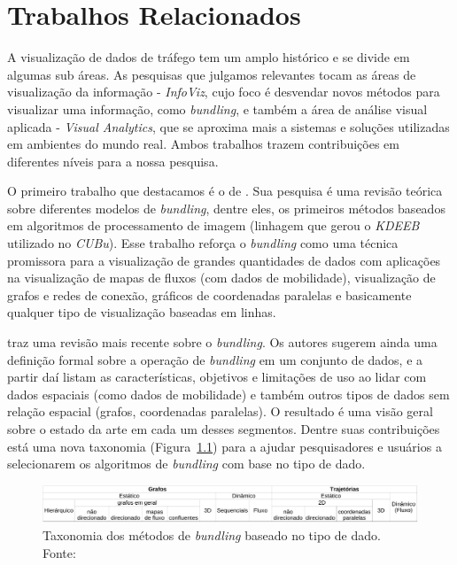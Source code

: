 \chapter{Trabalhos Relacionados}
\label{cap:trabalhos-relacionados}

  A visualização de dados de tráfego tem um amplo histórico e se divide em
algumas sub áreas. As pesquisas que julgamos relevantes tocam as áreas de
visualização da informação - \emph{InfoViz}, cujo foco é desvendar novos métodos
para visualizar uma informação, como \emph{bundling}, e também a área de análise
visual aplicada - \emph{Visual Analytics}, que se aproxima mais a sistemas e
soluções utilizadas em ambientes do mundo real. Ambos trabalhos trazem
contribuições em diferentes níveis para a nossa pesquisa.

O primeiro trabalho que destacamos é o de \citet{Zhou2013}.
Sua pesquisa é uma revisão teórica sobre diferentes modelos de \emph{bundling},
dentre eles, os primeiros métodos baseados em algoritmos de processamento de
imagem (linhagem que gerou o \emph{KDEEB} utilizado no \emph{CUBu}). Esse trabalho reforça o
\emph{bundling} como uma técnica promissora para a visualização de grandes
quantidades de dados com aplicações na visualização de mapas de fluxos (com
dados de mobilidade), visualização de grafos e redes de conexão, gráficos de
coordenadas paralelas e basicamente qualquer tipo de visualização baseadas em
linhas.

\citet{Lhuillier2017} traz uma revisão mais recente sobre
o \emph{bundling}. Os autores sugerem ainda uma definição formal sobre a operação de
\emph{bundling} em um conjunto de dados, e a partir daí listam as
características, objetivos e limitações de uso ao lidar com dados espaciais
(como dados de mobilidade) e também outros tipos de dados sem relação espacial
(grafos, coordenadas paralelas). O resultado é uma visão geral sobre o estado da
arte em cada um desses segmentos. Dentre suas contribuições está uma nova
taxonomia (Figura~\ref{table:bundling-methods}) para a ajudar pesquisadores e
usuários a selecionarem os algoritmos de \emph{bundling} com base no tipo de
dado. 

 \begin{figure}[!htb]
  \centering
  \includegraphics[width=\textwidth]{../figuras/estado-da-arte.pdf}
  \caption[Taxonomia dos métodos de \emph{bundling} baseado no tipo de dado]{Taxonomia dos métodos de \emph{bundling} baseado no tipo de dado. Fonte: \citet{Lhuillier2017}}
   \label{table:bundling-methods}
 \end{figure}

